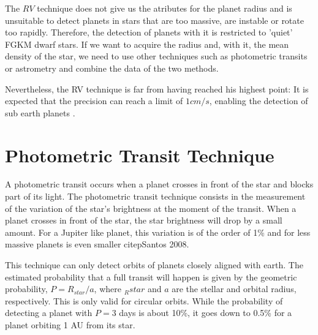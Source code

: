 \documentclass[dvips,12pt,a4paper]{report}
\begin{document}
The $RV$ technique does not give us the atributes for the planet radius and is unsuitable to detect planets in stars that are too massive, are instable or rotate too rapidly. Therefore, the detection of planets with it is restricted to 'quiet' FGKM dwarf stars. If we want to acquire the radius and, with it, the mean density of the star, we need to use other techniques such as photometric transits or astrometry and combine the data of the two methods.

Nevertheless, the RV technique is far from having reached his highest point: It is expected that the precision can reach a limit of $1cm/s$, enabling the detection of sub earth planets \citep{Lovis-2006b}. 




\section{Photometric Transit Technique}
\label{transit}
A photometric transit occurs when a planet crosses in front of the star and blocks part of its light. 
The photometric transit technique consists in the measurement of the variation of the star's brightness at the moment of the transit. When a planet crosses in front of the star, the star brightness will drop by a small amount. For a Jupiter like planet, this variation is of the order of 1\% and for less massive planets is even smaller citep{Santos 2008}. 

This technique can only detect orbits of planets closely aligned with earth. The estimated probability that a full transit will happen is given by the geometric probability, $P=R_{star}/a$, where $_R{star}$ and $a$ are the stellar and orbital radius, respectively. This is only valid for circular orbits. While the probability of detecting a planet with $P=3$ days is about 10\%, it goes down to 0.5\% for a planet orbiting 1 AU from its star.
\end{document}
